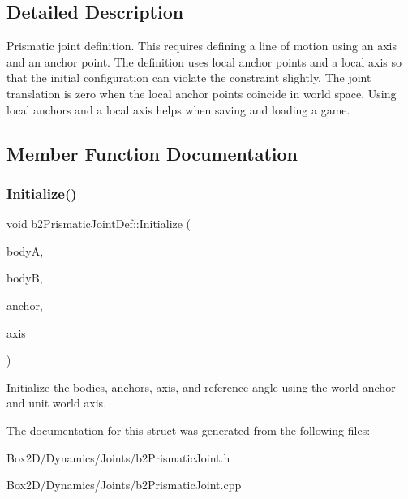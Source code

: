 \subsection{Detailed Description}
Prismatic joint definition. This requires defining a line of motion using an axis and an anchor point. The definition uses local anchor points and a local axis so that the initial configuration can violate the constraint slightly. The joint translation is zero when the local anchor points coincide in world space. Using local anchors and a local axis helps when saving and loading a game. 

\subsection{Member Function Documentation}
\mbox{\label{structb2_prismatic_joint_def_ae60043bc22b077e8c59ab248dc34652f}} 
\subsubsection{\texorpdfstring{Initialize()}{Initialize()}}
{\footnotesize\ttfamily void b2\+Prismatic\+Joint\+Def\+::\+Initialize (\begin{DoxyParamCaption}\item[{\hyperlink{classb2_body}{b2\+Body} $\ast$}]{bodyA,  }\item[{\hyperlink{classb2_body}{b2\+Body} $\ast$}]{bodyB,  }\item[{const \hyperlink{structb2_vec2}{b2\+Vec2} \&}]{anchor,  }\item[{const \hyperlink{structb2_vec2}{b2\+Vec2} \&}]{axis }\end{DoxyParamCaption})}

Initialize the bodies, anchors, axis, and reference angle using the world anchor and unit world axis. 

The documentation for this struct was generated from the following files\+:\begin{DoxyCompactItemize}
\item 
Box2\+D/\+Dynamics/\+Joints/b2\+Prismatic\+Joint.\+h\item 
Box2\+D/\+Dynamics/\+Joints/b2\+Prismatic\+Joint.\+cpp\end{DoxyCompactItemize}
